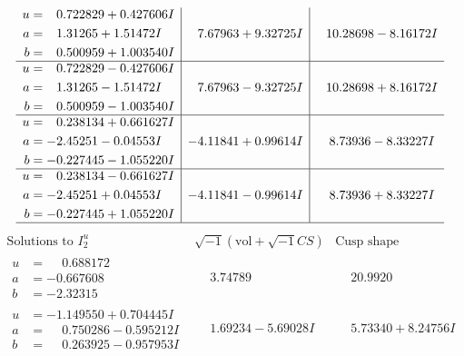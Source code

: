 \documentclass[1p]{elsarticle_modified}
\theoremstyle{definition}
\newcommand{\I}{\sqrt{-1}}
\begin{document}
$$\begin{array}{c|c|c}
\begin{aligned}
u &= \phantom{-}0.722829 + 0.427606 I \\
a &= \phantom{-}1.31265 + 1.51472 I \\
b &= \phantom{-}0.500959 + 1.003540 I\end{aligned}
 & \phantom{-}7.67963 + 9.32725 I & \phantom{-}10.28698 - 8.16172 I \\ \hline\begin{aligned}
u &= \phantom{-}0.722829 - 0.427606 I \\
a &= \phantom{-}1.31265 - 1.51472 I \\
b &= \phantom{-}0.500959 - 1.003540 I\end{aligned}
 & \phantom{-}7.67963 - 9.32725 I & \phantom{-}10.28698 + 8.16172 I \\ \hline\begin{aligned}
u &= \phantom{-}0.238134 + 0.661627 I \\
a &= -2.45251 - 0.04553 I \\
b &= -0.227445 - 1.055220 I\end{aligned}
 & -4.11841 + 0.99614 I & \phantom{-}8.73936 - 8.33227 I \\ \hline\begin{aligned}
u &= \phantom{-}0.238134 - 0.661627 I \\
a &= -2.45251 + 0.04553 I \\
b &= -0.227445 + 1.055220 I\end{aligned}
 & -4.11841 - 0.99614 I & \phantom{-}8.73936 + 8.33227 I\\
 \hline 
 \end{array}$$\newpage$$\begin{array}{c|c|c}  
\text{Solutions to }I^u_{2}& \I (\text{vol} + \sqrt{-1}CS) & \text{Cusp shape}\\
 \hline 
\begin{aligned}
u &= \phantom{-}0.688172\phantom{ +0.000000I} \\
a &= -0.667608\phantom{ +0.000000I} \\
b &= -2.32315\phantom{ +0.000000I}\end{aligned}
 & \phantom{-}3.74789\phantom{ +0.000000I} & \phantom{-}20.9920\phantom{ +0.000000I} \\ \hline\begin{aligned}
u &= -1.149550 + 0.704445 I \\
a &= \phantom{-}0.750286 - 0.595212 I \\
b &= \phantom{-}0.263925 - 0.957953 I\end{aligned}
 & \phantom{-}1.69234 - 5.69028 I & \phantom{-}5.73340 + 8.24756 I \\ \hline\begin{aligned}

\end{aligned}
\end{array}$$
\end{document}
